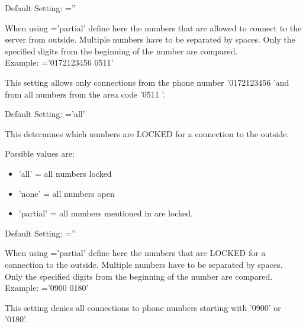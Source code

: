 \begin{description}
        Default Setting: =''

        When using ='partial' define here the numbers
        that are allowed to connect to the server from outside.
        Multiple numbers have to be separated by spaces.
        Only the specified digits from the beginning of the number are compared.
        \\
        Example: ='0172123456 0511'

        This setting allows only connections from the phone number '0172123456 'and
        from all numbers from the area code '0511 '.


        Default Setting: ='all'

        This determines which numbers are LOCKED for a connection to the outside.

        Possible values are:
        \begin{itemize}
           \item 'all' = all numbers locked
            \item 'none' = all numbers open
            \item 'partial' = all numbers mentioned in
                 are locked.
        \end{itemize}


        Default Setting: =''

        When using ='partial' define here the numbers
        that are LOCKED for a connection to the outside.
        Multiple numbers have to be separated by spaces.
        Only the specified digits from the beginning of the number are compared.\\

        Example: ='0900 0180'

        This setting denies all connections to phone numbers starting with '0900' or '0180'.


\end{description}

